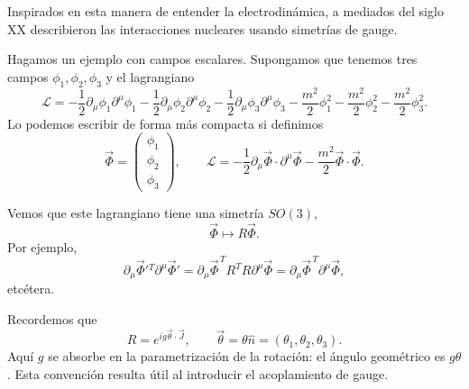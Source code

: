 \documentclass[11pt,a4paper]{article}
\newcommand{\concept}[1]{\textcolor{concept-green}{#1}}
\begin{document}
Inspirados en esta manera de entender la electrodinámica, a mediados del siglo
XX describieron las interacciones nucleares usando \concept{simetrías de gauge}.

Hagamos un ejemplo con campos escalares. Supongamos que tenemos tres campos
$\phi_1,\phi_2,\phi_3$ y el lagrangiano
\[
  \mathcal L=
  -\frac12\partial_\mu\phi_1\partial^\mu\phi_1
  -\frac12\partial_\mu\phi_2\partial^\mu\phi_2
  -\frac12\partial_\mu\phi_3\partial^\mu\phi_3
  -\frac{m^2}{2}\phi_1^2
  -\frac{m^2}{2}\phi_2^2
  -\frac{m^2}{2}\phi_3^2.
\]
Lo podemos escribir de forma más compacta si definimos
\[
  \vec\Phi=
  \begin{pmatrix}
    \phi_1\\
    \phi_2\\
    \phi_3
  \end{pmatrix},
  \qquad
  \mathcal L=-\frac12\partial_\mu\vec\Phi\cdot\partial^\mu\vec\Phi
             -\frac{m^2}{2}\vec\Phi\cdot\vec\Phi.
\]

Vemos que este lagrangiano tiene una simetría $SO(3)$,
\[
  \vec\Phi\longmapsto R\vec\Phi.
\]
Por ejemplo,
\[
  \partial_\mu\vec\Phi'{}^T\partial^\mu\vec\Phi'
  =\partial_\mu\vec\Phi^{\,T}R^TR\partial^\mu\vec\Phi
  =\partial_\mu\vec\Phi^{\,T}\partial^\mu\vec\Phi,
\]
etcétera.

Recordemos que
\[
  R=e^{ig\vec\theta\cdot\vec J},
  \qquad
  \vec\theta=\theta\hat n=(\theta_1,\theta_2,\theta_3).
\]
Aquí $g$ se absorbe en la parametrización de la rotación:
el ángulo geométrico es $g\theta$. Esta convención resulta útil
al introducir el acoplamiento de gauge.
\end{document}
